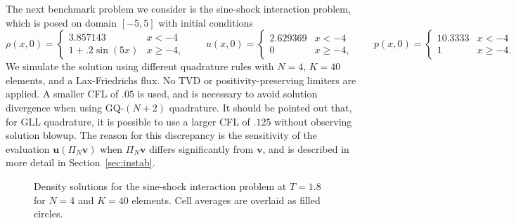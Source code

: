 \documentclass[preprint,10pt]{elsarticle}
\theoremstyle{definition}
\theoremstyle{lemma}
\theoremstyle{theorem}
\theoremstyle{assumption}
\newcommand{\LRp}[1]{\left( #1 \right)}
\begin{document}
The next benchmark problem we consider is the sine-shock interaction problem, which is posed on domain $[-5,5]$ with initial conditions
\[
\rho(x,0) = \begin{cases}
3.857143 & x < -4\\
1 + .2\sin(5x) & x \geq -4,
\end{cases} 
\qquad
u(x,0) = \begin{cases}
2.629369 & x < -4\\
0 & x \geq -4,
\end{cases}
\qquad
p(x,0) = \begin{cases}
10.3333 & x < -4\\
1 & x \geq -4.
\end{cases}
\]
We simulate the solution using different quadrature rules with $N=4$, $K=40$ elements, and a Lax-Friedrichs flux.  No TVD or positivity-preserving limiters are applied.  A smaller CFL of $.05$ is used, and is necessary to avoid solution divergence when using GQ-$(N+2)$ quadrature.  It should be pointed out that, for GLL quadrature, it is possible to use a larger CFL of $.125$ without observing solution blowup.  The reason for this discrepancy is the sensitivity of the evaluation $\bm{u}\LRp{\Pi_N \bm{v}}$ when $\Pi_N \bm{v}$ differs significantly from $\bm{v}$, and is described in more detail in Section~\ref{sec:instab}.  
\begin{figure}
\centering
\hspace{.1em}
\caption{Density solutions for the sine-shock interaction problem at $T = 1.8$ for $N = 4$ and $K = 40$ elements.  Cell averages are overlaid as filled circles.  }
\label{fig:sineshock}
\end{figure}
\end{document}
